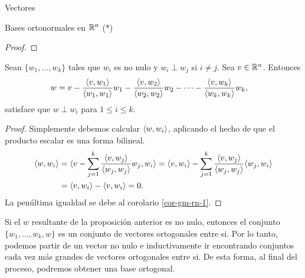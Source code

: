 \begin{chapter}{Vectores}
\begin{section}{Bases ortonormales en $\mathbb R^n$ (*)}
\begin{proof}
    \end{proof}


  
    \begin{proposicion}\label{th-gram-scmidt-rn}
        Sean $\{w_1,\ldots,w_k\}$ tales que $w_i$  es no nulo y  $w_i \perp w_j$ si $i\ne j$. Sea $v \in \mathbb R^n$. Entonces
        \begin{align*}
         w&= v - \frac{\langle v,w_1\rangle}{\langle w_1,w_1\rangle}w_1- \frac{\langle v,w_2\rangle}{\langle w_2,w_2\rangle}w_2 - \cdots - \frac{\langle v,w_{k}\rangle}{\langle w_{k},w_{k}\rangle}w_{k},
        \end{align*}
        satisface que $w\perp w_i$ para $1 \le i \le k$.
    \end{proposicion} 
    \begin{proof}
        Simplemente debemos calcular  $\langle w, w_i\rangle$,  aplicando el hecho de que el producto escalar es una forma bilineal. 
        \begin{align*}
        \langle w, w_i \rangle &= \langle  v - \sum_{j = 1}^{k} \frac{\langle v,w_{j}\rangle}{\langle w_{j},w_{j}\rangle}w_{j} , w_i \rangle 
        = \langle v, w_i\rangle -  \sum_{j = 1}^{k} \frac{\langle v,w_{j}\rangle}{\langle w_{j},w_{j}\rangle}\langle w_{j} , w_i \rangle \\
        &=  \langle v, w_i\rangle -  \langle v, w_i\rangle = 0.
        \end{align*}
        La penúltima igualdad se debe al corolario \ref{cor-gm-rn-1}.
    \end{proof}

\begin{obs*} Si el $w$  resultante de la proposición anterior es no nulo,  entonces el conjunto  $\{w_1,\ldots,w_k,w\}$ es un conjunto de vectores ortogonales entre si. Por lo tanto, podemos partir de un vector no  nulo e inductivamente ir encontrando  conjuntos cada vez más grandes de vectores ortogonales entre si. De esta forma, al final del proceso, podremos obtener una base ortogonal. 
\end{obs*}



\end{section}
\end{chapter}
